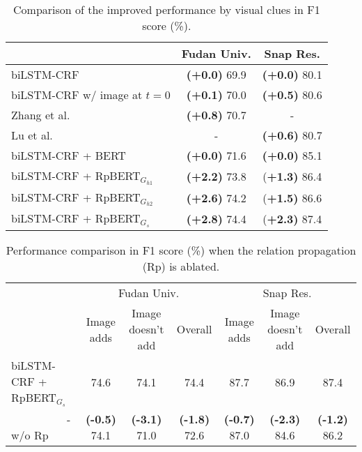 \documentclass[letterpaper]{article} \usepackage{aaai21}  \usepackage{times}  \usepackage{helvet} \usepackage{courier}  \usepackage[hyphens]{url}  \usepackage{graphicx} \urlstyle{rm} \def\UrlFont{\rm}  \usepackage{natbib}  \usepackage{caption} \frenchspacing  \setlength{\pdfpagewidth}{8.5in}  \setlength{\pdfpageheight}{11in}
\begin{document}
\begin{table}[tb]

\centering
\small
\begin{tabular}{|l|cc|} 
  \hline
&  Fudan  Univ. &  Snap  Res. \\
\hline
biLSTM-CRF & \textbf{(+0.0)} 69.9& \textbf{(+0.0)} 80.1  \\ 
			biLSTM-CRF w/ image at $t=0$ & \textbf{(+0.1)} 70.0& \textbf{(+0.5)} 80.6 \\ 
			Zhang et al.~\shortcite{zhang2018adaptive}  & \textbf{(+0.8)} 70.7 & - \\ 
			Lu et al.~\shortcite{lu2018visual} & - & \textbf{(+0.6)} 80.7 \\ 
			\hline
biLSTM-CRF + BERT &\textbf{(+0.0)} 71.6& \textbf{(+0.0)} 85.1  \\ 
biLSTM-CRF + RpBERT$_{G_{h1}}$ &\textbf{(+2.2)} 73.8& (\textbf{+1.3)} 86.4   \\ 
			biLSTM-CRF + RpBERT$_{G_{h2}}$  &\textbf{(+2.6)} 74.2& (\textbf{+1.5)} 86.6   \\ 
			biLSTM-CRF + RpBERT$_{G_{s}}$  &\textbf{(+2.8)} 74.4& (\textbf{+2.3)} 87.4   \\ 
\hline
\end{tabular}
\caption{Comparison of the improved performance by visual clues in F1 score (\%).}\label{tab:CompNER}
\end{table}



\setcounter{table}{5}

\begin{table*}[tb]

\centering
\small
\begin{tabular}{|l|ccc|ccc|} 

	\hline
&  \multicolumn{3}{c|}{Fudan Univ.} &  \multicolumn{3}{c|}{Snap Res.} \\\cline{2-7}
				& Image adds &Image doesn't add & Overall & Image adds & Image doesn't add & Overall   \\
\hline
biLSTM-CRF + RpBERT$_{G_{s}}$ & 74.6  & 74.1  & 74.4 & 87.7  & 86.9 & 87.4\\			
		  ~~~~~~~~~~- w/o Rp &\textbf{(-0.5)} 74.1& \textbf{(-3.1)} 71.0& \textbf{(-1.8)} 72.6 & \textbf{(-0.7)} 87.0& \textbf{(-2.3)}  84.6 & \textbf{(-1.2)} 86.2 \\
\hline
\end{tabular}
\caption{Performance comparison in F1 score (\%) when the relation propagation (Rp) is ablated.}\label{tab:RGNAblated}
\end{table*}
\end{document}
